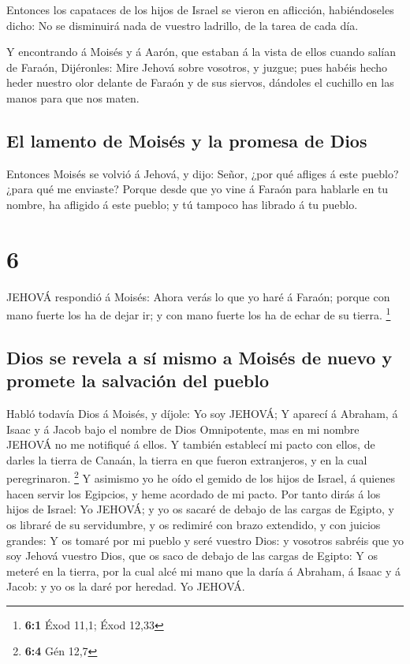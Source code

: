  Entonces los capataces de los hijos de Israel se vieron en
aflicción, habiéndoseles dicho: No se disminuirá nada de vuestro
ladrillo, de la tarea de cada día.

 Y encontrando á Moisés y á Aarón, que estaban á la vista
de ellos cuando salían de Faraón,  Dijéronles: Mire Jehová
sobre vosotros, y juzgue; pues habéis hecho heder nuestro olor delante
de Faraón y de sus siervos, dándoles el cuchillo en las manos para que
nos maten.

\hypertarget{el-lamento-de-moisuxe9s-y-la-promesa-de-dios}{%
\subsection{El lamento de Moisés y la promesa de
Dios}\label{el-lamento-de-moisuxe9s-y-la-promesa-de-dios}}

 Entonces Moisés se volvió á Jehová, y dijo: Señor, ¿por
qué afliges á este pueblo? ¿para qué me enviaste?  Porque
desde que yo vine á Faraón para hablarle en tu nombre, ha afligido á
este pueblo; y tú tampoco has librado á tu pueblo.

\hypertarget{section-5}{%
\section{6}\label{section-5}}

 JEHOVÁ respondió á Moisés: Ahora verás lo que yo haré á
Faraón; porque con mano fuerte los ha de dejar ir; y con mano fuerte los
ha de echar de su tierra. \footnote{\textbf{6:1} Éxod 11,1; Éxod 12,33}

\hypertarget{dios-se-revela-a-suxed-mismo-a-moisuxe9s-de-nuevo-y-promete-la-salvaciuxf3n-del-pueblo}{%
\subsection{Dios se revela a sí mismo a Moisés de nuevo y promete la
salvación del
pueblo}\label{dios-se-revela-a-suxed-mismo-a-moisuxe9s-de-nuevo-y-promete-la-salvaciuxf3n-del-pueblo}}

 Habló todavía Dios á Moisés, y díjole: Yo soy JEHOVÁ;
 Y aparecí á Abraham, á Isaac y á Jacob bajo el nombre de
Dios Omnipotente, mas en mi nombre JEHOVÁ no me notifiqué á ellos.
 Y también establecí mi pacto con ellos, de darles la tierra
de Canaán, la tierra en que fueron extranjeros, y en la cual
peregrinaron. \footnote{\textbf{6:4} Gén 12,7}  Y asimismo
yo he oído el gemido de los hijos de Israel, á quienes hacen servir los
Egipcios, y heme acordado de mi pacto.  Por tanto dirás á
los hijos de Israel: Yo JEHOVÁ; y yo os sacaré de debajo de las cargas
de Egipto, y os libraré de su servidumbre, y os redimiré con brazo
extendido, y con juicios grandes:  Y os tomaré por mi pueblo
y seré vuestro Dios: y vosotros sabréis que yo soy Jehová vuestro Dios,
que os saco de debajo de las cargas de Egipto:  Y os meteré
en la tierra, por la cual alcé mi mano que la daría á Abraham, á Isaac y
á Jacob: y yo os la daré por heredad. Yo JEHOVÁ.

